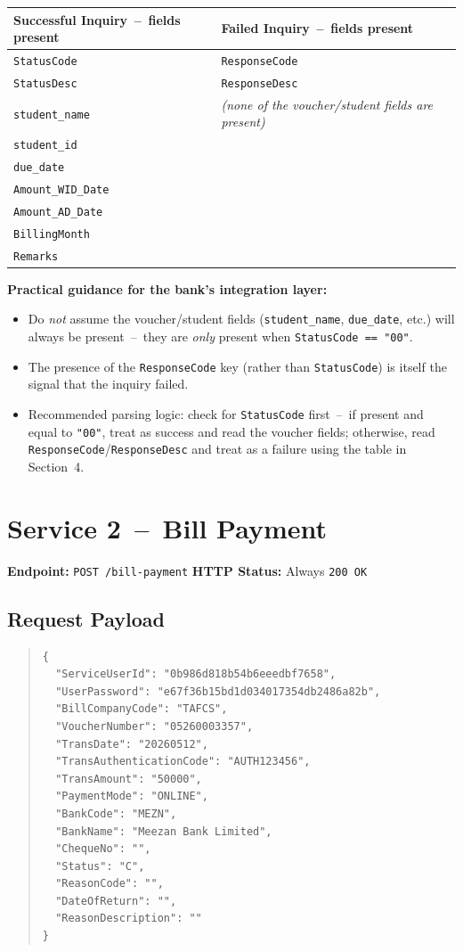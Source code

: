 \documentclass[11pt]{article}
\begin{document}
\begin{center}
\begin{tabular}{@{}p{}p{}@{}}
\toprule
\textbf{Successful Inquiry \,--\, fields present} & \textbf{Failed Inquiry \,--\, fields present} \\
\midrule
\texttt{StatusCode} & \texttt{ResponseCode} \\
\texttt{StatusDesc} & \texttt{ResponseDesc} \\
\texttt{student\_name} & \emph{(none of the voucher/student fields are present)} \\
\texttt{student\_id} & \\
\texttt{due\_date} & \\
\texttt{Amount\_WID\_Date} & \\
\texttt{Amount\_AD\_Date} & \\
\texttt{BillingMonth} & \\
\texttt{Remarks} & \\
\bottomrule
\end{tabular}
\end{center}

\noindent\textbf{Practical guidance for the bank's integration layer:}
\begin{itemize}
    \item Do \emph{not} assume the voucher/student fields (\texttt{student\_name}, \texttt{due\_date}, etc.) will always be present \,--\, they are \emph{only} present when \texttt{StatusCode == "00"}.
    \item The presence of the \texttt{ResponseCode} key (rather than \texttt{StatusCode}) is itself the signal that the inquiry failed.
    \item Recommended parsing logic: check for \texttt{StatusCode} first \,--\, if present and equal to \texttt{"00"}, treat as success and read the voucher fields; otherwise, read \texttt{ResponseCode}/\texttt{ResponseDesc} and treat as a failure using the table in Section~4.
\end{itemize}

\section{Service 2 \,--\, Bill Payment}
\textbf{Endpoint:} \texttt{POST /bill-payment} \hfill \textbf{HTTP Status:} Always \texttt{200 OK}

\subsection{Request Payload}
\begin{quote}
\begin{verbatim}
{
  "ServiceUserId": "0b986d818b54b6eeedbf7658",
  "UserPassword": "e67f36b15bd1d034017354db2486a82b",
  "BillCompanyCode": "TAFCS",
  "VoucherNumber": "05260003357",
  "TransDate": "20260512",
  "TransAuthenticationCode": "AUTH123456",
  "TransAmount": "50000",
  "PaymentMode": "ONLINE",
  "BankCode": "MEZN",
  "BankName": "Meezan Bank Limited",
  "ChequeNo": "",
  "Status": "C",
  "ReasonCode": "",
  "DateOfReturn": "",
  "ReasonDescription": ""
}
\end{verbatim}
\end{quote}
\end{document}
